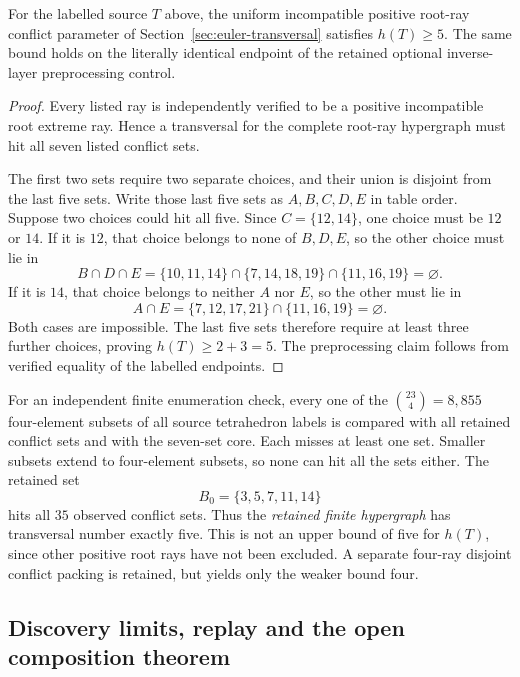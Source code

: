 \begin{proposition}
\label{prop:connected-sum-h-five}
For the labelled source $T$ above, the uniform incompatible positive
root-ray conflict parameter of Section~\ref{sec:euler-transversal}
satisfies $h(T)\ge5$.  The same bound holds on the literally identical
endpoint of the retained optional inverse-layer preprocessing control.
\end{proposition}
\begin{proof}
Every listed ray is independently verified to be a positive incompatible
root extreme ray.  Hence a transversal for the complete root-ray
hypergraph must hit all seven listed conflict sets.

The first two sets require two separate choices, and their union is
disjoint from the last five sets.  Write those last five sets as
$A,B,C,D,E$ in table order.  Suppose two choices could hit all five.
Since $C=\{12,14\}$, one choice must be $12$ or $14$.
If it is $12$, that choice belongs to none of $B,D,E$, so the other
choice must lie in
\[
 B\cap D\cap E
 =\{10,11,14\}\cap\{7,14,18,19\}\cap\{11,16,19\}
 =\varnothing.
\]
If it is $14$, that choice belongs to neither $A$ nor $E$, so the
other must lie in
\[
 A\cap E=\{7,12,17,21\}\cap\{11,16,19\}=\varnothing.
\]
Both cases are impossible.  The last five sets therefore require at
least three further choices, proving $h(T)\ge2+3=5$.  The preprocessing
claim follows from verified equality of the labelled endpoints.
\end{proof}

For an independent finite enumeration check, every one of the
$\binom{23}{4}=8{,}855$ four-element subsets of all source tetrahedron
labels is compared with all retained conflict sets and with the
seven-set core.  Each misses at least one set.  Smaller subsets extend
to four-element subsets, so none can hit all the sets either.  The
retained set
\[
 B_0=\{3,5,7,11,14\}
\]
hits all $35$ observed conflict sets.  Thus the \emph{retained finite
hypergraph} has transversal number exactly five.  This is not an upper
bound of five for $h(T)$, since other positive root rays have not been
excluded.  A separate four-ray disjoint conflict packing is retained,
but yields only the weaker bound four.

\subsection{Discovery limits, replay and the open composition theorem}

